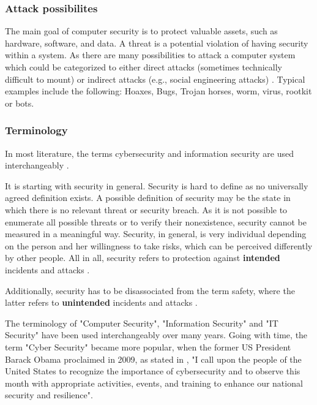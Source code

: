 \subsubsection{Attack possibilites}
The main goal of computer security is to protect valuable assets, such as hardware, software, and data. A threat is a potential violation of having security within a system. As there are many possibilities to attack a computer system which could be categorized to either direct attacks (sometimes technically difficult to mount) or indirect attacks (e.g., social engineering attacks) \cite{Bishop2003}. Typical examples include the following: Hoaxes, Bugs, Trojan horses,  worm, virus, rootkit or bots.

\subsubsection{Terminology}
In most literature, the terms cybersecurity and information security are used interchangeably \cite{VonSolms2013}.

It is starting with security in general. Security is hard to define as no universally agreed definition exists. A possible definition of security may be the state in which there is no relevant threat or security breach. As it is not possible to enumerate all possible threats or to verify their nonexistence, security cannot be measured in a meaningful way. Security, in general, is very individual depending on the person and her willingness to take risks, which can be perceived differently by other people. All in all, security refers to protection against \textbf{intended} incidents and attacks \cite{Bishop2004, Pfleeger2014}.

Additionally, security has to be disassociated from the term safety, where the latter refers to \textbf{unintended} incidents and attacks \cite{Bishop2004}.

The terminology of "Computer Security", "Information Security" and "IT Security" have been used interchangeably over many years. Going with time, the term "Cyber Security" became more popular, when the former US President Barack Obama proclaimed in 2009, as stated in \cite{TheWhiteHouse2009}, "I call upon the people of the United States to recognize the importance of cybersecurity and to observe this month with appropriate activities, events, and training to enhance our national security and resilience".


